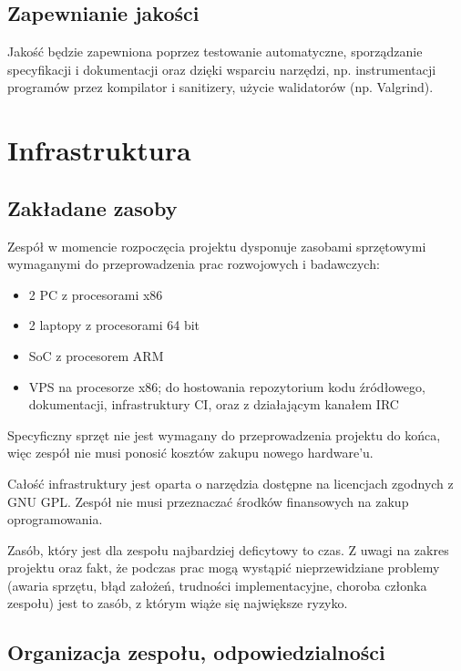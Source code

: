 \documentclass[11pt,oneside,a4paper,titlepage,onecolumn]{article}
\begin{document}
\subsection{Zapewnianie jakości}

Jakość  będzie zapewniona poprzez testowanie automatyczne, sporządzanie specyfikacji i dokumentacji 
oraz dzięki wsparciu narzędzi, np. instrumentacji programów przez kompilator i sanitizery, użycie walidatorów (np.
Valgrind).


\section{Infrastruktura}

\subsection{Zakładane zasoby}

Zespół w momencie rozpoczęcia projektu dysponuje zasobami sprzętowymi wymaganymi do przeprowadzenia prac
rozwojowych i badawczych:

\begin{itemize}
    \item 2 PC z procesorami x86
    \item 2 laptopy z procesorami 64 bit
    \item SoC z procesorem ARM
    \item VPS na procesorze x86; do hostowania repozytorium kodu źródłowego, dokumentacji, infrastruktury CI, oraz
        z działającym kanałem IRC
\end{itemize}

Specyficzny sprzęt nie jest wymagany do przeprowadzenia projektu do końca, więc zespół nie musi ponosić
kosztów zakupu nowego hardware'u.

Całość infrastruktury jest oparta o narzędzia dostępne na licencjach zgodnych z GNU GPL. Zespół nie musi
przeznaczać środków finansowych na zakup oprogramowania.

Zasób, który jest dla zespołu najbardziej deficytowy to czas. Z uwagi
na zakres projektu oraz fakt, że podczas prac mogą wystąpić nieprzewidziane problemy (awaria sprzętu, błąd
założeń, trudności implementacyjne, choroba członka zespołu) jest to zasób, z którym wiąże się największe
ryzyko.

\subsection{Organizacja zespołu, odpowiedzialności}
\end{document}
